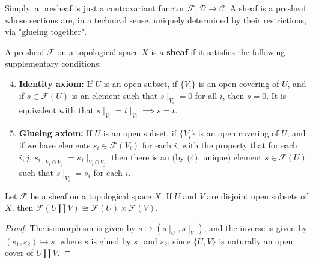 \documentclass[11pt]{article}
\begin{document}
Simply, a presheaf is just a contravariant functor 
$ \mathscr{F} : \mathcal{D} \to \mathcal{C} $. 
A sheaf is a presheaf whose sections are, 
in a technical sense, uniquely determined by their restrictions, 
via "glueing together". 

\begin{definition}
    A presheaf $\mathscr{F}$ on a topological space $X$ 
    is a \textbf{sheaf} if it satisfies the following 
    supplementary conditions:
    \begin{enumerate}[label=(\arabic*)]
        \setcounter{enumi}{3}
        \item \textbf{Identity axiom:} 
            If $U$ is an open subset, 
            if $\{V_{i}\}$ is an open covering of $U$, 
            and if $s \in \mathscr{F}(U)$ is an element such 
            that $s \mid_{V_{i}}=0$ for all $i$, 
            then $s=0$. 
            It is equivalent with that  
            $s \mid_{V_{i}}=t\mid_{V_{i}} \implies s=t$. 

        \item \textbf{Glueing axiom:} If $U$ is an open subset, 
        if $\{V_{i}\}$ is an open covering of $U$, 
        and if we have elements $s_{i} \in \mathscr{F}(V_{i})$ 
        for each $i$, with the property that for each $i,j$, 
        $s_{i} \mid_{V_{i}\cap V_{j}}=s_{j} \mid_{V_{i}\cap V_{j}}$ 
        then there is an (by (4), unique) element 
        $s \in \mathscr{F}(U)$ such that $s \mid_{V_{i}} =s_{i}$ 
        for each $i$. 
    \end{enumerate}
\end{definition}

\begin{lemma}
    Let $ \mathscr{F} $ be a sheaf on a topological space $ X $. 
    If $ U $ and $ V $ are disjoint open subsets of $ X $, 
    then $ \mathscr{F}(U \amalg V) \cong \mathscr{F}(U) \times \mathscr{F}(V) $. 
\end{lemma}

\begin{proof}
    The isomorphism is given by $ s \mapsto (s \mid_{U}, s \mid_{V}) $, 
    and the inverse is given by $ (s_{1},s_{2}) \mapsto s$, 
    where $ s $ is glued by $ s_{1} $ and $ s_{2} $, 
    since $ \{U,V\} $ is naturally an open cover of $ U \amalg V $. 
\end{proof}
\end{document}
